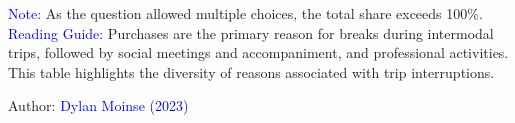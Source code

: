         \begin{table}[h!]
        \centering
        \renewcommand{\arraystretch}{1.5}
    \caption{Reasons for the 110 breaks reported by intermodal cyclists during intermodal journeys.}
    \label{table-chap5:motifs-pauses}
        \vspace{5pt}
        \begin{flushleft}\scriptsize{
        \textcolor{blue}{Note:} As the question allowed multiple choices, the total share exceeds 100\%.
        \\
        \textcolor{blue}{Reading Guide:} Purchases are the primary reason for breaks during intermodal trips, followed by social meetings and accompaniment, and professional activities. This table highlights the diversity of reasons associated with trip interruptions.
        }\end{flushleft}
        \begin{flushright}\scriptsize{
        Author: \textcolor{blue}{Dylan Moinse (2023)}
        }\end{flushright}
        \end{table}